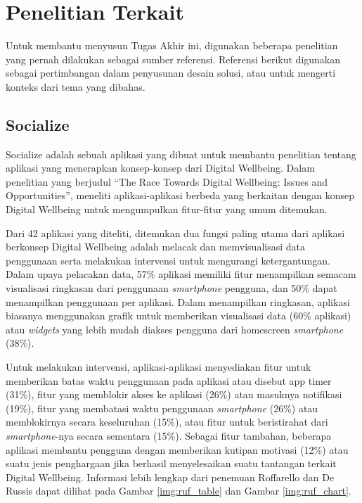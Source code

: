 

\section{Penelitian Terkait}
\label{sec:penelitian_terkait}

Untuk membantu menyusun Tugas Akhir ini, digunakan beberapa penelitian yang pernah dilakukan sebagai sumber referensi. Referensi berikut digunakan sebagai pertimbangan dalam penyusunan desain solusi, atau untuk mengerti konteks dari tema yang dibahas.

\subsection{Socialize}

Socialize adalah sebuah aplikasi yang dibuat untuk membantu penelitian tentang aplikasi yang menerapkan konsep-konsep dari Digital Wellbeing. Dalam penelitian yang berjudul “The Race Towards Digital Wellbeing: Issues and Opportunities”, \textcite{CHI2019SOCIALIZE} meneliti aplikasi-aplikasi berbeda yang berkaitan dengan konsep Digital Wellbeing untuk mengumpulkan fitur-fitur yang umum ditemukan.

Dari 42 aplikasi yang diteliti, ditemukan dua fungsi paling utama dari aplikasi berkonsep Digital Wellbeing adalah melacak dan memvisualisasi data penggunaan serta melakukan intervensi untuk mengurangi ketergantungan. Dalam upaya pelacakan data, 57\% aplikasi memiliki fitur menampilkan semacam visualisasi ringkasan dari penggunaan \textit{smartphone} pengguna, dan 50\% dapat menampilkan penggunaan per aplikasi. Dalam menampilkan ringkasan, aplikasi biasanya menggunakan grafik untuk memberikan visualisasi data (60\% aplikasi) atau \textit{widgets} yang lebih mudah diakses pengguna dari homescreen \textit{smartphone} (38\%).

Untuk melakukan intervensi, aplikasi-aplikasi menyediakan fitur untuk memberikan batas waktu penggunaan pada aplikasi atau disebut app timer (31\%), fitur yang memblokir akses ke aplikasi (26\%) atau masuknya notifikasi (19\%), fitur yang membatasi waktu penggunaan \textit{smartphone} (26\%) atau memblokirnya secara keseluruhan (15\%), atau fitur untuk beristirahat dari \textit{smartphone}-nya secara sementara (15\%). Sebagai fitur tambahan, beberapa aplikasi membantu pengguna dengan memberikan kutipan motivasi (12\%) atau suatu jenis penghargaan jika berhasil menyelesaikan suatu tantangan terkait Digital Wellbeing. Informasi lebih lengkap dari penemuan Roffarello dan De Russis dapat dilihat pada Gambar \ref{img:ruf_table} dan Gambar \ref{img:ruf_chart}.

